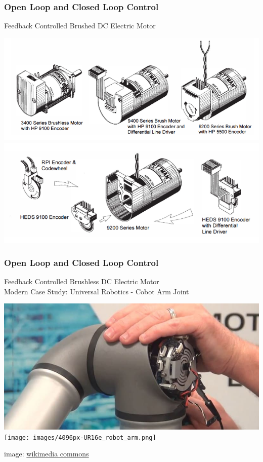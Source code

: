 \documentclass[fleqn]{beamer} %
\newcommand{\sectiontitleII}{Open Loop and Closed Loop Control}
\begin{document}
	\begin{frame} \small
		\frametitle{\sectiontitleII}

		Feedback Controlled Brushed DC Electric Motor

		\includegraphics[scale=0.25]{images/pittman_encoder_01.png} \\
	
		\includegraphics[scale=0.25]{images/pittman_encoder_02.png}	

	\end{frame}

	\begin{frame} \small
		\frametitle{\sectiontitleII}

		Feedback Controlled Brushless DC Electric Motor \\

		Modern Case Study: Universal Robotics - Cobot Arm Joint

		\includegraphics[scale=.2]{images/UR3-Joint-Replacement.jpg}
		\texttt{[image: images/4096px-UR16e\_robot\_arm.png]}

		\tiny{ \hspace{70mm} image: \href{https://upload.wikimedia.org/wikipedia/commons/1/16/UR16e_robot_arm.png}{wikimedia commons}}
	\end{frame}
\end{document}
